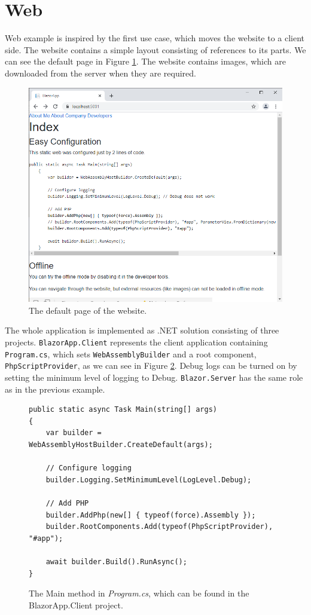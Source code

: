 \section{Web}

Web example is inspired by the first use case, which moves the website to a client side.
The website contains a simple layout consisting of references to its parts.
We can see the default page in Figure \ref{img28:website}.
The website contains images, which are downloaded from the server when they are required.
\par
\begin{figure}
\centering
\includegraphics[scale=0.5]{./img/Web}
\caption{The default page of the website.}
\label{img28:website}
\end{figure} 
\par
The whole application is implemented as .NET solution consisting of three projects.
\texttt{BlazorApp.Client} represents the client application containing \texttt{Program.cs}, which sets \texttt{WebAssemblyBuilder} and a root component, \texttt{PhpScriptProvider}, as we can see in Figure \ref{img20:program}.
Debug logs can be turned on by setting the minimum level of logging to Debug.
\texttt{Blazor.Server} has the same role as in the previous example.
\par
\begin{figure}
\begin{lstlisting}
public static async Task Main(string[] args)
{
	var builder = WebAssemblyHostBuilder.CreateDefault(args);

	// Configure logging
	builder.Logging.SetMinimumLevel(LogLevel.Debug);

	// Add PHP
	builder.AddPhp(new[] { typeof(force).Assembly });
	builder.RootComponents.Add(typeof(PhpScriptProvider), "#app");
            
	await builder.Build().RunAsync();
}
\end{lstlisting}
\caption{The Main method in \textit{Program.cs}, which can be found in the BlazorApp.Client project.}
\label{img20:program}
\end{figure}
